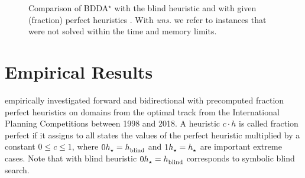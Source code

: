 \begin{figure}
    \\
    \\
    \vspace{-0.2cm}
    \caption[Comparison of BDDA$^\star$ with two different heuristics.]{
        Comparison of BDDA$^\star$ with the blind heuristic and with given (fraction) perfect heuristics \autocite{speck-et-al-icaps2020}.
        With \emph{uns.} we refer to instances that were not solved within the time and memory limits.
    }
    \label{fig:bddastar_data}
\end{figure}

\section{Empirical Results}
\textcite{speck-et-al-icaps2020} empirically investigated forward and bidirectional \bddastar{} with precomputed fraction perfect heuristics on domains from the optimal track from the International Planning Competitions between 1998 and 2018.
A heuristic $c \cdot h$ is called fraction perfect if it assigns to all states the values of the perfect heuristic multiplied by a constant $0 \leq c \leq 1$, where $0h_\text{\scriptsize{\ensuremath{\star}}}^\text{\scriptsize{}} = h_\text{\scriptsize{blind}}^\text{\scriptsize{}}$ and $1h_\text{\scriptsize{\ensuremath{\star}}}^\text{\scriptsize{}} = h_\text{\scriptsize{\ensuremath{\star}}}^\text{\scriptsize{}}$ are important extreme cases.
Note that \bddastar{} with blind heuristic $0h_\text{\scriptsize{\ensuremath{\star}}}^\text{\scriptsize{}} = h_\text{\scriptsize{blind}}^\text{\scriptsize{}}$ corresponds to symbolic blind search.

